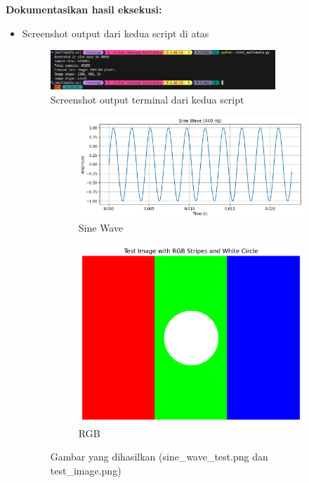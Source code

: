 \documentclass[11pt,a4paper]{article}
\begin{document}
\textbf{Dokumentasikan hasil eksekusi:}
\begin{itemize}
    \item Screenshot output dari kedua script di atas
    \begin{figure}[h]
        \centering
        \includegraphics[width=0.8\textwidth]{Figure/img7.png}
        \caption{Screenshot output terminal dari kedua script}
        \vspace{0.1cm}
    \end{figure}
    \begin{figure}[H]
    \centering
    \begin{subfigure}[b]{0.48\textwidth}
        \centering
        \includegraphics[width=\linewidth]{Figure/sine_wave_test.png}
        \caption{Sine Wave}
    \end{subfigure}\hfill
    \begin{subfigure}[b]{0.48\textwidth}
        \centering
        \includegraphics[width=\linewidth]{Figure/test_image.png}
        \caption{RGB}
    \end{subfigure}
    \caption{Gambar yang dihasilkan (sine\_wave\_test.png dan test\_image.png)}
    \label{fig:sine-rgb}
\end{figure}

\end{itemize}
\end{document}
